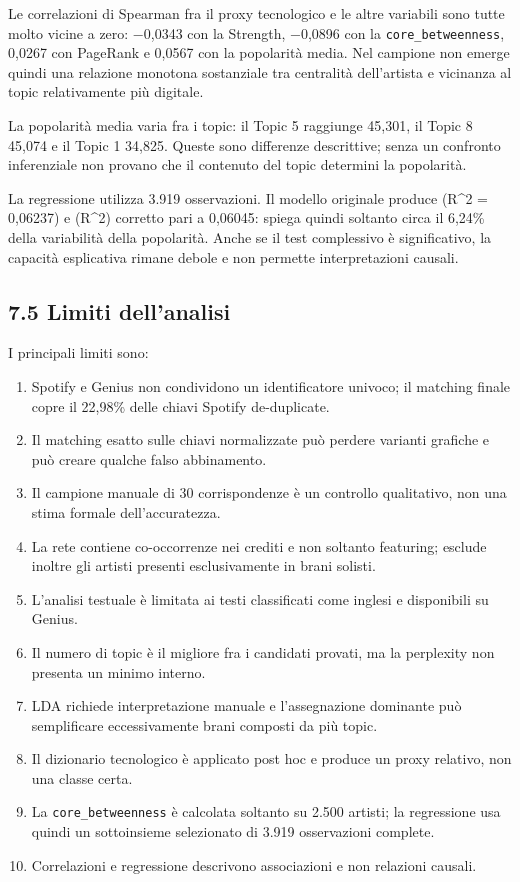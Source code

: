 \documentclass[
]{article}
\providecommand{\tightlist}{%
  \setlength{\itemsep}{0pt}\setlength{\parskip}{0pt}}
\begin{document}
Le correlazioni di Spearman fra il proxy tecnologico e le altre
variabili sono tutte molto vicine a zero: −0,0343 con la Strength,
−0,0896 con la \texttt{core\_betweenness}, 0,0267 con PageRank e 0,0567
con la popolarità media. Nel campione non emerge quindi una relazione
monotona sostanziale tra centralità dell'artista e vicinanza al topic
relativamente più digitale.

La popolarità media varia fra i topic: il Topic 5 raggiunge 45,301, il
Topic 8 45,074 e il Topic 1 34,825. Queste sono differenze descrittive;
senza un confronto inferenziale non provano che il contenuto del topic
determini la popolarità.

La regressione utilizza 3.919 osservazioni. Il modello originale produce
(R\^{}2 = 0,06237) e (R\^{}2) corretto pari a 0,06045: spiega quindi
soltanto circa il 6,24\% della variabilità della popolarità. Anche se il
test complessivo è significativo, la capacità esplicativa rimane debole
e non permette interpretazioni causali.

\subsection{7.5 Limiti dell'analisi}\label{limiti-dellanalisi}

I principali limiti sono:

\begin{enumerate}
\def\labelenumi{\arabic{enumi}.}
\tightlist
\item
  Spotify e Genius non condividono un identificatore univoco; il
  matching finale copre il 22,98\% delle chiavi Spotify de-duplicate.
\item
  Il matching esatto sulle chiavi normalizzate può perdere varianti
  grafiche e può creare qualche falso abbinamento.
\item
  Il campione manuale di 30 corrispondenze è un controllo qualitativo,
  non una stima formale dell'accuratezza.
\item
  La rete contiene co-occorrenze nei crediti e non soltanto featuring;
  esclude inoltre gli artisti presenti esclusivamente in brani solisti.
\item
  L'analisi testuale è limitata ai testi classificati come inglesi e
  disponibili su Genius.
\item
  Il numero di topic è il migliore fra i candidati provati, ma la
  perplexity non presenta un minimo interno.
\item
  LDA richiede interpretazione manuale e l'assegnazione dominante può
  semplificare eccessivamente brani composti da più topic.
\item
  Il dizionario tecnologico è applicato post hoc e produce un proxy
  relativo, non una classe certa.
\item
  La \texttt{core\_betweenness} è calcolata soltanto su 2.500 artisti;
  la regressione usa quindi un sottoinsieme selezionato di 3.919
  osservazioni complete.
\item
  Correlazioni e regressione descrivono associazioni e non relazioni
  causali.
\end{enumerate}
\end{document}
